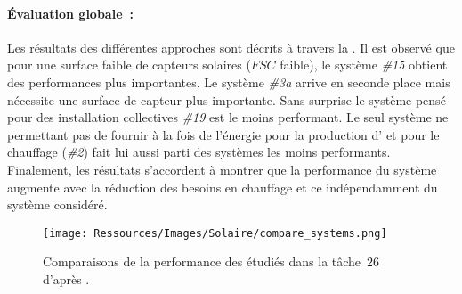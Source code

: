 \paragraph{Évaluation globale~:} %
\label{par:evaluation_globale}
Les résultats des différentes approches sont décrits à travers la .
Il est observé que pour une surface faible de capteurs solaires ($FSC$ faible), le système \emph{\#15}
obtient des performances plus importantes. Le système \emph{\#3a} arrive en seconde place
mais nécessite une surface de capteur plus importante. Sans surprise le système pensé
pour des installation collectives \emph{\#19} est le moins performant. Le seul système
ne permettant pas de fournir à la fois de l’énergie pour la production d’
et pour le chauffage (\emph{\#2}) fait lui aussi parti des systèmes les moins performants.
Finalement, les résultats s’accordent à montrer que la performance du système augmente avec la réduction des
besoins en chauffage et ce indépendamment du système considéré.

\begin{figure}
    \centering
    \texttt{[image: Ressources/Images/Solaire/compare\_systems.png]}
    \caption[Comparaisons de la performance des  étudiés dans la tâche\,$26$]
            {Comparaisons de la performance des  étudiés dans la tâche
             \,$26$ d’après \textcite{Task26C2007}.}
    \label{fig:compare_perf_ssc}
\end{figure}

